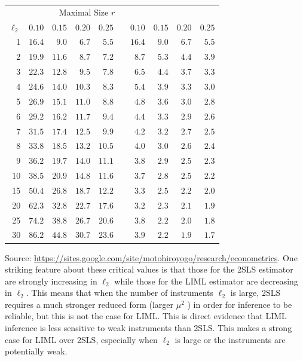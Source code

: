 \documentclass[10pt]{article}
\begin{document}
\begin{tabular}{rrrrrrrrrr}
\hline\hline
 & \multicolumn{6}{c}{Maximal Size $r$} &  &  &  \\
\cline { 2 - 5 }\cline { 7 - 11 }
$\ell_{2}$ & $0.10$ & $0.15$ & $0.20$ & $0.25$ &  & $0.10$ & $0.15$ & $0.20$ & $0.25$ \\
\hline
1 & $16.4$ & $9.0$ & $6.7$ & $5.5$ &  & $16.4$ & $9.0$ & $6.7$ & $5.5$ \\
2 & $19.9$ & $11.6$ & $8.7$ & $7.2$ &  & $8.7$ & $5.3$ & $4.4$ & $3.9$ \\
3 & $22.3$ & $12.8$ & $9.5$ & $7.8$ &  & $6.5$ & $4.4$ & $3.7$ & $3.3$ \\
4 & $24.6$ & $14.0$ & $10.3$ & $8.3$ &  & $5.4$ & $3.9$ & $3.3$ & $3.0$ \\
5 & $26.9$ & $15.1$ & $11.0$ & $8.8$ &  & $4.8$ & $3.6$ & $3.0$ & $2.8$ \\
6 & $29.2$ & $16.2$ & $11.7$ & $9.4$ &  & $4.4$ & $3.3$ & $2.9$ & $2.6$ \\
7 & $31.5$ & $17.4$ & $12.5$ & $9.9$ &  & $4.2$ & $3.2$ & $2.7$ & $2.5$ \\
8 & $33.8$ & $18.5$ & $13.2$ & $10.5$ &  & $4.0$ & $3.0$ & $2.6$ & $2.4$ \\
9 & $36.2$ & $19.7$ & $14.0$ & $11.1$ &  & $3.8$ & $2.9$ & $2.5$ & $2.3$ \\
10 & $38.5$ & $20.9$ & $14.8$ & $11.6$ &  & $3.7$ & $2.8$ & $2.5$ & $2.2$ \\
15 & $50.4$ & $26.8$ & $18.7$ & $12.2$ &  & $3.3$ & $2.5$ & $2.2$ & $2.0$ \\
20 & $62.3$ & $32.8$ & $22.7$ & $17.6$ &  & $3.2$ & $2.3$ & $2.1$ & $1.9$ \\
25 & $74.2$ & $38.8$ & $26.7$ & $20.6$ &  & $3.8$ & $2.2$ & $2.0$ & $1.8$ \\
30 & $86.2$ & $44.8$ & $30.7$ & $23.6$ &  & $3.9$ & $2.2$ & $1.9$ & $1.7$ \\
\hline
\end{tabular}

Source: \href{https://sites.google.com/site/motohiroyogo/research/econometrics}{https://sites.google.com/site/motohiroyogo/research/econometrics}. One striking feature about these critical values is that those for the 2SLS estimator are strongly increasing in $\ell_{2}$ while those for the LIML estimator are decreasing in $\ell_{2}$. This means that when the number of instruments $\ell_{2}$ is large, 2SLS requires a much stronger reduced form (larger $\mu^{2}$ ) in order for inference to be reliable, but this is not the case for LIML. This is direct evidence that LIML inference is less sensitive to weak instruments than 2SLS. This makes a strong case for LIML over 2SLS, especially when $\ell_{2}$ is large or the instruments are potentially weak.
\end{document}
